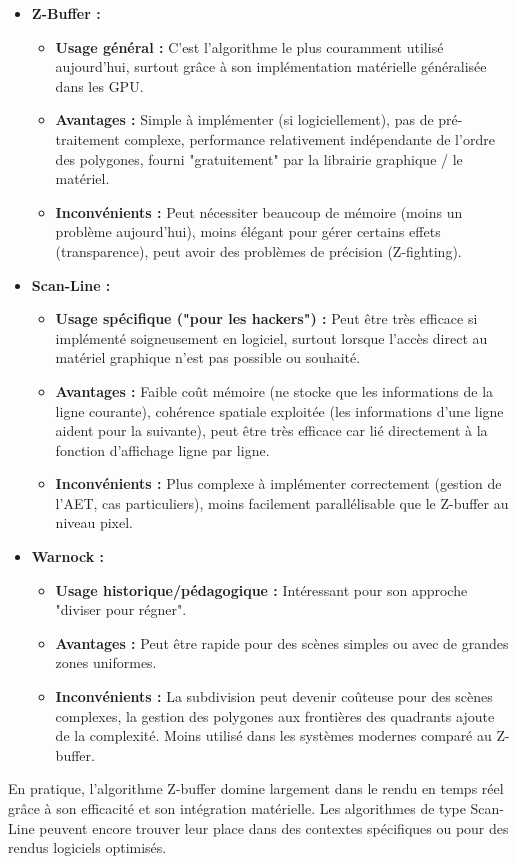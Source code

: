 \documentclass{article}
\begin{document}
\begin{itemize}
    \item \textbf{Z-Buffer :}
        \begin{itemize}
            \item \textbf{Usage général :} C'est l'algorithme le plus couramment utilisé aujourd'hui, surtout grâce à son implémentation matérielle généralisée dans les GPU.
            \item \textbf{Avantages :} Simple à implémenter (si logiciellement), pas de pré-traitement complexe, performance relativement indépendante de l'ordre des polygones, fourni "gratuitement" par la librairie graphique / le matériel.
            \item \textbf{Inconvénients :} Peut nécessiter beaucoup de mémoire (moins un problème aujourd'hui), moins élégant pour gérer certains effets (transparence), peut avoir des problèmes de précision (Z-fighting).
        \end{itemize}
    \item \textbf{Scan-Line :}
        \begin{itemize}
            \item \textbf{Usage spécifique ("pour les hackers") :} Peut être très efficace si implémenté soigneusement en logiciel, surtout lorsque l'accès direct au matériel graphique n'est pas possible ou souhaité.
            \item \textbf{Avantages :} Faible coût mémoire (ne stocke que les informations de la ligne courante), cohérence spatiale exploitée (les informations d'une ligne aident pour la suivante), peut être très efficace car lié directement à la fonction d'affichage ligne par ligne.
            \item \textbf{Inconvénients :} Plus complexe à implémenter correctement (gestion de l'AET, cas particuliers), moins facilement parallélisable que le Z-buffer au niveau pixel.
        \end{itemize}
     \item \textbf{Warnock :}
         \begin{itemize}
             \item \textbf{Usage historique/pédagogique :} Intéressant pour son approche "diviser pour régner".
             \item \textbf{Avantages :} Peut être rapide pour des scènes simples ou avec de grandes zones uniformes.
             \item \textbf{Inconvénients :} La subdivision peut devenir coûteuse pour des scènes complexes, la gestion des polygones aux frontières des quadrants ajoute de la complexité. Moins utilisé dans les systèmes modernes comparé au Z-buffer.
         \end{itemize}
\end{itemize}

En pratique, l'algorithme Z-buffer domine largement dans le rendu en temps réel grâce à son efficacité et son intégration matérielle. Les algorithmes de type Scan-Line peuvent encore trouver leur place dans des contextes spécifiques ou pour des rendus logiciels optimisés.
\end{document}
